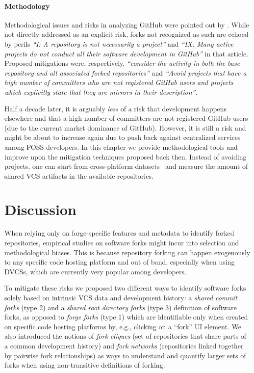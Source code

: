 \paragraph{Methodology}

Methodological issues and risks in analyzing GitHub were pointed out by
\textcite{kalliamvakou2014promises}. While not directly
addressed as an explicit risk, forks not recognized as such are echoed by
perils \emph{``I\@: A repository is not necessarily a project''} and
\emph{``IX\@: Many active projects do not conduct all their software
development in GitHub''} in that article. Proposed mitigations were,
respectively,
\emph{``consider the activity in both the base repository and all associated
  forked repositories''} and \emph{``Avoid projects that have a high number of
  committers who are not registered GitHub users and projects which explicitly
  state that they are mirrors in their description''}.

Half a decade later, it is arguably \emph{less} of a risk that development
happens elsewhere and that a high number of committers are not registered
GitHub users (due to the current market dominance of GitHub). However, it is
still a risk and might be about to increase again due to push back against
centralized services among FOSS developers.  In this chapter we provide
methodological tools and improve upon the mitigation techniques proposed back
then. Instead of avoiding projects, one can start from cross-platform
datasets~\cite{swhcacm2018, swh-provenance-emse, swh-msr2019-dataset,
mockus2019woc} and measure the amount of shared \gls{VCS} artifacts in the
available repositories.


\section{Discussion}%
\label{sec:forks-conclusion}

When relying only on forge-specific features and metadata to identify forked
repositories, empirical studies on software forks might incur into selection
and methodological biases. This is because repository forking can happen
exogenously to any specific code hosting platform and out of band, especially
when using \glspl{DVCS}, which are currently very popular among developers.

To mitigate these risks we proposed two different ways to identify software
forks solely based on intrinsic \gls{VCS} data and development history: a
\emph{shared commit forks} (type 2) and a \emph{shared root directory forks}
(type 3) definition of software forks, as opposed to \emph{forge forks} (type
1) which are identifiable only when created on specific code hosting platforms
by, e.g., clicking on a ``fork'' UI element.  We also introduced the notions of
\emph{fork cliques} (set of repositories that share parts of a common
development history) and \emph{fork networks} (repositories linked together by
pairwise fork relationships) as ways to understand and quantify larger sets of
forks when using non-transitive definitions of forking.

